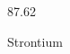 \documentclass[12pt]{article}
\begin{document}
\hfill{}
\vfill
\begin{center}
  {\fontsize{50}{60}
  }

  87.62

Strontium
\end{center}
\vfill
\end{document}
